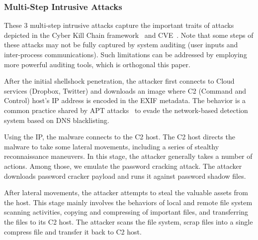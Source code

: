 \subsubsection{Multi-Step Intrusive Attacks}
\label{subsubsec:attack-cases}

These 3 multi-step intrusive attacks capture the important traits of attacks depicted in the Cyber Kill Chain framework~\cite{cyberkillchain} and CVE~\cite{cve}. 
Note that some steps of these attacks may not be fully captured by system auditing (\eg user inputs and inter-process communications).
Such limitations can be addressed by employing more powerful auditing tools, which is
orthogonal this paper.

After the initial shellshock penetration, the attacker first connects to Cloud services (\eg Dropbox, Twitter) and downloads an image where C2 (Command and Control) host's IP address is encoded in the EXIF metadata. The behavior is a common practice shared by APT attacks~\cite{hammertoss,vpnfilter} to evade the network-based detection system based on DNS blacklisting.

Using the IP, the malware connects to the C2 host. 
The C2 host directs the malware to take some lateral movements, including a series of stealthy reconnaissance maneuvers. 
In this stage, the attacker generally takes a number of actions. 
Among those, we emulate the password cracking attack. 
The attacker downloads password cracker payload  and runs it against password shadow files.

After lateral movements, the attacker attempts to steal the valuable assets from the host. 
This stage mainly involves the behaviors of local and remote file system scanning activities, copying and compressing of important files, and transferring the files to its C2 host.
The attacker scans the file system, scrap files into a single compress file and transfer it back to C2 host.


